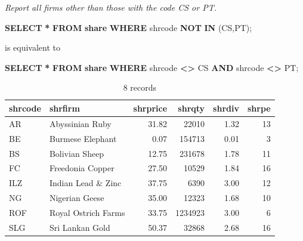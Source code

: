 \documentclass[
]{article}
\newenvironment{Shaded}{\begin{snugshade}}{\end{snugshade}}
\newcommand{\KeywordTok}[1]{\textcolor[rgb]{0.13,0.29,0.53}{\textbf{#1}}}
\newcommand{\NormalTok}[1]{#1}
\newcommand{\OperatorTok}[1]{\textcolor[rgb]{0.81,0.36,0.00}{\textbf{#1}}}
\newcommand{\StringTok}[1]{\textcolor[rgb]{0.31,0.60,0.02}{#1}}
\begin{document}
\emph{Report all firms other than those with the code CS or PT.}

\begin{Shaded}
\begin{Highlighting}[]
\KeywordTok{SELECT} \OperatorTok{*} \KeywordTok{FROM} \KeywordTok{share} \KeywordTok{WHERE}\NormalTok{ shrcode }\KeywordTok{NOT} \KeywordTok{IN}\NormalTok{ (}\StringTok{\textquotesingle{}CS\textquotesingle{}}\NormalTok{,}\StringTok{\textquotesingle{}PT\textquotesingle{}}\NormalTok{);}
\end{Highlighting}
\end{Shaded}

is equivalent to

\begin{Shaded}
\begin{Highlighting}[]
\KeywordTok{SELECT} \OperatorTok{*} \KeywordTok{FROM} \KeywordTok{share} \KeywordTok{WHERE}\NormalTok{ shrcode }\OperatorTok{\textless{}\textgreater{}} \StringTok{\textquotesingle{}CS\textquotesingle{}} \KeywordTok{AND}\NormalTok{ shrcode }\OperatorTok{\textless{}\textgreater{}} \StringTok{\textquotesingle{}PT\textquotesingle{}}\NormalTok{;}
\end{Highlighting}
\end{Shaded}

\begin{table}

\caption{\label{tab:unnamed-chunk-16}8 records}
\centering
\begin{tabular}[t]{l|l|r|r|r|r}
\hline
shrcode & shrfirm & shrprice & shrqty & shrdiv & shrpe\\
\hline
AR & Abyssinian Ruby & 31.82 & 22010 & 1.32 & 13\\
\hline
BE & Burmese Elephant & 0.07 & 154713 & 0.01 & 3\\
\hline
BS & Bolivian Sheep & 12.75 & 231678 & 1.78 & 11\\
\hline
FC & Freedonia Copper & 27.50 & 10529 & 1.84 & 16\\
\hline
ILZ & Indian Lead \& Zinc & 37.75 & 6390 & 3.00 & 12\\
\hline
NG & Nigerian Geese & 35.00 & 12323 & 1.68 & 10\\
\hline
ROF & Royal Ostrich Farms & 33.75 & 1234923 & 3.00 & 6\\
\hline
SLG & Sri Lankan Gold & 50.37 & 32868 & 2.68 & 16\\
\hline
\end{tabular}
\end{table}
\end{document}
